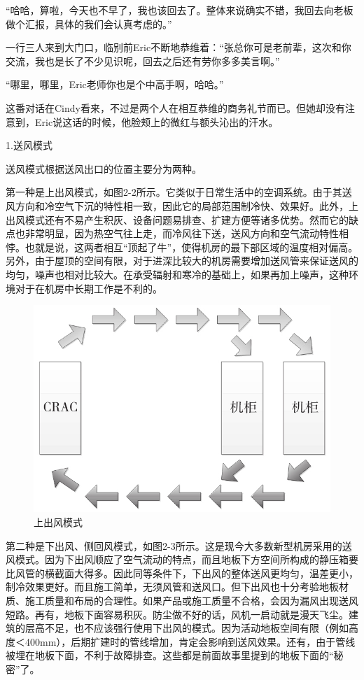 \documentclass[12pt,UTF8]{ctexbook}
\begin{document}
“哈哈，算啦，今天也不早了，我也该回去了。整体来说确实不错，我回去向老板做个汇报，具体的我们会认真考虑的。”

一行三人来到大门口，临别前Eric不断地恭维着：“张总你可是老前辈，这次和你交流，我也是长了不少见识呢，回去之后还有劳你多多美言啊。”

“哪里，哪里，Eric老师你也是个中高手啊，哈哈。”

这番对话在Cindy看来，不过是两个人在相互恭维的商务礼节而已。但她却没有注意到，Eric说这话的时候，他脸颊上的微红与额头沁出的汗水。

1.送风模式

送风模式根据送风出口的位置主要分为两种。

第一种是上出风模式，如图2-2所示。它类似于日常生活中的空调系统。由于其送风方向和冷空气下沉的特性相一致，因此它的局部范围制冷快、效果好。此外，上出风模式还有不易产生积灰、设备问题易排查、扩建方便等诸多优势。然而它的缺点也非常明显，因为热空气往上走，而冷风往下送，送风方向和空气流动特性相悖。也就是说，这两者相互“顶起了牛”，使得机房的最下部区域的温度相对偏高。另外，由于屋顶的空间有限，对于进深比较大的机房需要增加送风管来保证送风的均匀，噪声也相对比较大。在承受辐射和寒冷的基础上，如果再加上噪声，这种环境对于在机房中长期工作是不利的。

\begin{figure}[htbp]
	\centering
	\includegraphics[width=1\linewidth]{2}
	\caption{上出风模式}
	\label{fig:1}
\end{figure}

第二种是下出风、侧回风模式，如图2-3所示。这是现今大多数新型机房采用的送风模式。因为下出风顺应了空气流动的特点，而且地板下方空间所构成的静压箱要比风管的横截面大得多。因此同等条件下，下出风的整体送风更均匀，温差更小，制冷效果更好。而且施工简单，无须风管和送风口。但下出风也十分考验地板材质、施工质量和布局的合理性。如果产品或施工质量不合格，会因为漏风出现送风短路。再有，地板下面容易积灰。防尘做不好的话，风机一启动就是漫天飞尘。建筑的层高不足，也不应该强行使用下出风的模式。因为活动地板空间有限（例如高度＜400mm），后期扩建时的管线增加，肯定会影响到送风效果。还有，由于管线被埋在地板下面，不利于故障排查。这些都是前面故事里提到的地板下面的“秘密”了。
\end{document}
